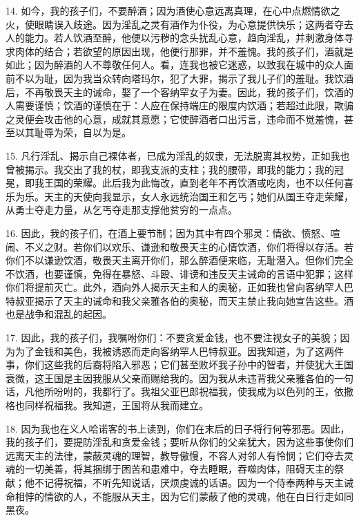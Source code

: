 14. 如今，我的孩子们，不要醉酒；因为酒使心意远离真理，在心中点燃情欲之火，使眼睛误入歧途。因为淫乱之灵有酒作为仆役，为心意提供快乐；这两者夺去人的能力。若人饮酒至醉，他便以污秽的念头扰乱心意，趋向淫乱，并刺激身体寻求肉体的结合；若欲望的原因出现，他便行那罪，并不羞愧。我的孩子们，酒就是如此；因为醉酒的人不尊敬任何人。看，连我也被它迷惑，以致我在城中的众人面前不以为耻，因为我当众转向塔玛尔，犯了大罪，揭示了我儿子们的羞耻。我饮酒后，不再敬畏天主的诫命，娶了一个客纳罕女子为妻。因此，我的孩子们，饮酒的人需要谨慎；饮酒的谨慎在于：人应在保持端庄的限度内饮酒；若超过此限，欺骗之灵便会攻击他的心意，成就其意愿；它使醉酒者口出污言，违命而不觉羞愧，甚至以其耻辱为荣，自以为是。\par

15. 凡行淫乱、揭示自己裸体者，已成为淫乱的奴隶，无法脱离其权势，正如我也曾被揭示。我交出了我的杖，即我支派的支柱；我的腰带，即我的能力；我的冠冕，即我王国的荣耀。此后我为此悔改，直到老年不再饮酒或吃肉，也不以任何喜乐为乐。天主的天使向我显示，女人永远统治国王和乞丐；她们从国王夺走荣耀，从勇士夺走力量，从乞丐夺走那支撑他贫穷的一点点。\par

16. 因此，我的孩子们，在酒上要节制；因为其中有四个邪灵：情欲、愤怒、喧闹、不义之财。若你们以欢乐、谦逊和敬畏天主的心情饮酒，你们将得以存活。若你们不以谦逊饮酒，敬畏天主离开你们，那么醉酒便来临，无耻潜入。但你们完全不饮酒，也要谨慎，免得在暴怒、斗殴、诽谤和违反天主诫命的言语中犯罪；这样你们将提前灭亡。此外，酒向外人揭示天主和人的奥秘，正如我也曾向客纳罕人巴特叔亚揭示了天主的诫命和我父亲雅各伯的奥秘，而天主禁止我向她宣告这些。酒也是战争和混乱的起因。\par

17. 因此，我的孩子们，我嘱咐你们：不要贪爱金钱，也不要注视女子的美貌；因为为了金钱和美色，我被诱惑而走向客纳罕人巴特叔亚。因我知道，为了这两件事，你们这些我的后裔将陷入邪恶；它们甚至败坏我子孙中的智者，并使犹大王国衰微，这王国是主因我服从父亲而赐给我的。因为我从未违背我父亲雅各伯的一句话，凡他所吩咐的，我都行了。我祖父亚巴郎祝福我，使我成为以色列的王，依撒格也同样祝福我。我知道，王国将从我而建立。\par

18. 因为我也在义人哈诺客的书上读到，你们在末后的日子将行何等邪恶。因此，我的孩子们，要提防淫乱和贪爱金钱；要听从你们的父亲犹大，因为这些事使你们远离天主的法律，蒙蔽灵魂的理智，教导傲慢，不容人对邻人有怜悯；它们夺去灵魂的一切美善，将其捆绑于困苦和患难中，夺去睡眠，吞噬肉体，阻碍天主的祭献；他不记得祝福，不听先知说话，厌烦虔诚的话语。因为一个侍奉两种与天主诫命相悖的情欲的人，不能服从天主，因为它们蒙蔽了他的灵魂，他在白日行走如同黑夜。\par

